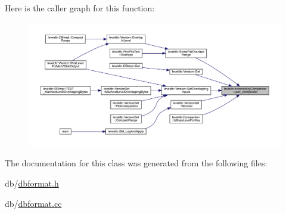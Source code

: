 Here is the caller graph for this function\+:
\nopagebreak
\begin{figure}[H]
\begin{center}
\leavevmode
\includegraphics[width=350pt]{classleveldb_1_1_internal_key_comparator_ac8c5db699e5defed74c6b17ddadf90f8_icgraph}
\end{center}
\end{figure}


The documentation for this class was generated from the following files\+:\begin{DoxyCompactItemize}
\item 
db/\mbox{\hyperlink{dbformat_8h}{dbformat.\+h}}\item 
db/\mbox{\hyperlink{dbformat_8cc}{dbformat.\+cc}}\end{DoxyCompactItemize}
